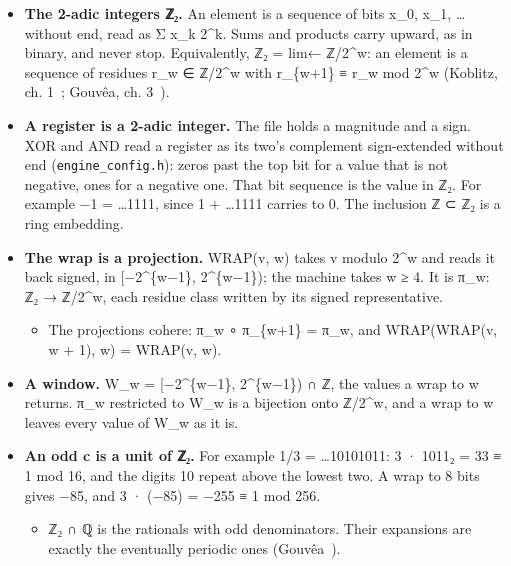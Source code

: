 \begin{itemize}
\item \textbf{The 2-adic integers ℤ₂.} An element is a sequence of bits x\_\allowbreak{}0, x\_\allowbreak{}1, … without end, read as Σ x\_\allowbreak{}k 2\textasciicircum{}k. Sums and products carry upward, as in binary, and never stop. Equivalently, ℤ₂ = lim← ℤ/2\textasciicircum{}w: an element is a sequence of residues r\_\allowbreak{}w ∈ ℤ/2\textasciicircum{}w with r\_\allowbreak{}\{w+1\} ≡ r\_\allowbreak{}w mod 2\textasciicircum{}w (Koblitz, ch. 1~\cite{src:Koblitz-1984}; Gouvêa, ch. 3~\cite{src:Gouv-a-1997}).
\item \textbf{A register is a 2-adic integer.} The file holds a magnitude and a sign. XOR and AND read a register as its two's complement sign-extended without end (\texttt{engine\_\allowbreak{}config.\allowbreak{}h}): zeros past the top bit for a value that is not negative, ones for a negative one. That bit sequence is the value in ℤ₂. For example −1 = …1111, since 1 + …1111 carries to 0. The inclusion ℤ ⊂ ℤ₂ is a ring embedding.
\item \textbf{The wrap is a projection.} WRAP(v, w) takes v modulo 2\textasciicircum{}w and reads it back signed, in [−2\textasciicircum{}\{w−1\}, 2\textasciicircum{}\{w−1\}); the machine takes w ≥ 4. It is π\_\allowbreak{}w: ℤ₂ → ℤ/2\textasciicircum{}w, each residue class written by its signed representative.

\begin{itemize}
\item The projections cohere: π\_\allowbreak{}w ∘ π\_\allowbreak{}\{w+1\} = π\_\allowbreak{}w, and WRAP(WRAP(v, w + 1), w) = WRAP(v, w).
\end{itemize}
\item \textbf{A window.} W\_\allowbreak{}w = [−2\textasciicircum{}\{w−1\}, 2\textasciicircum{}\{w−1\}) ∩ ℤ, the values a wrap to w returns. π\_\allowbreak{}w restricted to W\_\allowbreak{}w is a bijection onto ℤ/2\textasciicircum{}w, and a wrap to w leaves every value of W\_\allowbreak{}w as it is.
\item \textbf{An odd c is a unit of ℤ₂.} For example 1/3 = …10101011: 3 · 1011₂ = 33 ≡ 1 mod 16, and the digits 10 repeat above the lowest two. A wrap to 8 bits gives −85, and 3 · (−85) = −255 ≡ 1 mod 256.

\begin{itemize}
\item ℤ₂ ∩ ℚ is the rationals with odd denominators. Their expansions are exactly the eventually periodic ones (Gouvêa~\cite{src:Gouv-a-1997}).
\end{itemize}
\end{itemize}


